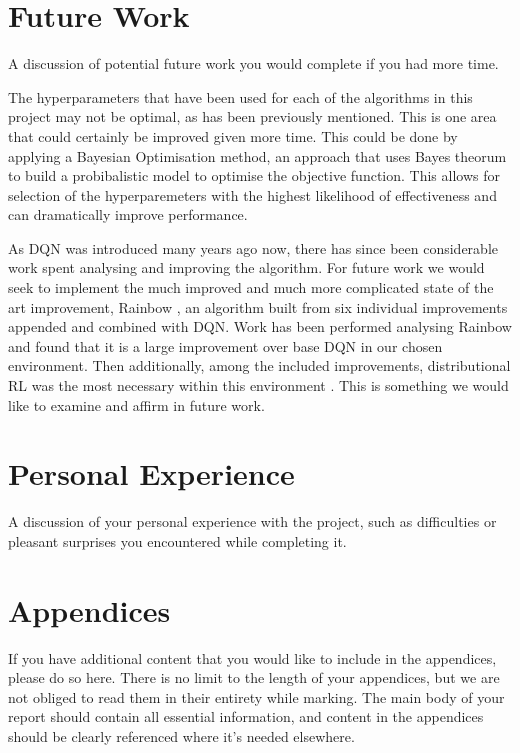 \documentclass{article}
\begin{document}
\section{Future Work}
A discussion of potential future work you would complete if you had more
time.

The hyperparameters that have been used for each of the algorithms in this project may not be optimal, as has been previously mentioned. This is one area that could certainly be improved given more time. This could be done by applying a Bayesian Optimisation method, an approach that uses Bayes theorum to build a probibalistic model to optimise the objective function. This allows for selection of the hyperparemeters with the highest likelihood of effectiveness and can dramatically improve performance.

As DQN was introduced many years ago now, there has since been considerable work spent analysing and improving the algorithm. For future work we would seek to implement the much improved and much more complicated state of the art improvement, Rainbow \citep{rainbow}, an algorithm built from six individual improvements appended and combined with DQN. Work has been performed analysing Rainbow and found that it is a large improvement over base DQN in our chosen environment. Then additionally, among the included improvements, distributional RL \citep{distributionalrl} was the most necessary within this environment \cite{revisitingrainbow}. This is something we would like to examine and affirm in future work. 

\section{Personal Experience}
A discussion of your personal experience with the project, such as
difficulties or pleasant surprises you encountered while completing it.




\newpage
\section*{Appendices}
If you have additional content that you would like to include in the appendices, please do so here.
There is no limit to the length of your appendices, but we are not obliged to read them in their entirety while marking. The main body of your report should contain all essential information, and content in the appendices should be clearly referenced where it's needed elsewhere.
\end{document}
